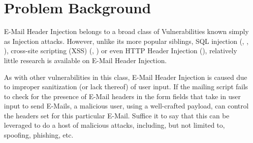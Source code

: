 \section{Problem Background}

E-Mail Header Injection belongs to a broad class of Vulnerabilities known simply as Injection attacks. However, unlike its more popular siblings, SQL injection (\cite{sql0}, \cite{sql1}, \cite{sql2}), cross-site scripting (XSS) (\cite{Injection1}, \cite{KleinAmit}) or even HTTP Header Injection (\cite{sessionride}), relatively little research is available on E-Mail Header Injection.

As with other vulnerabilities in this class, E-Mail Header Injection is caused due to improper sanitization (or lack thereof) of user input. If the mailing script fails to check for the presence of E-Mail headers in the form fields that take in user input to send E-Mails, a malicious user, using a well-crafted payload, can control the headers set for this particular E-Mail. Suffice it to say that this can be leveraged to do a host of malicious attacks, including, but not limited to, spoofing, phishing, etc.